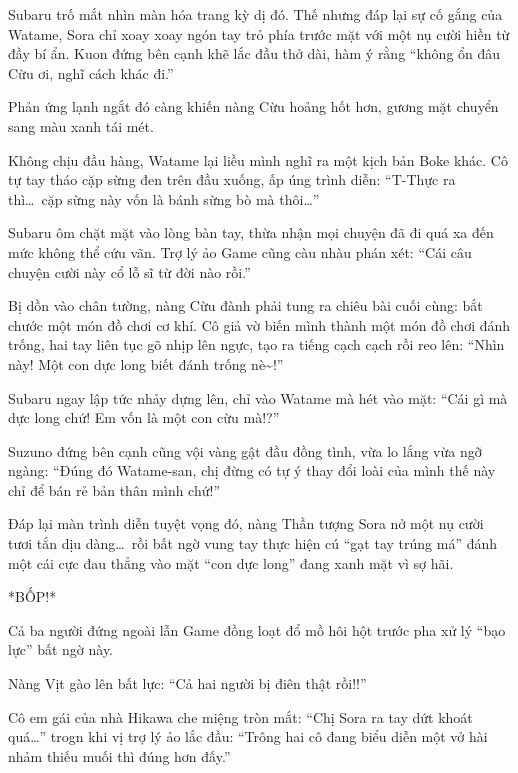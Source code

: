 \documentclass[../main.tex]{subfiles}
\begin{document}

Subaru trố mắt nhìn màn hóa trang kỳ dị đó. Thế nhưng đáp lại sự cố gắng của Watame, Sora chỉ xoay xoay ngón tay trỏ phía trước mặt với một nụ cười hiền từ đầy bí ẩn. Kuon đứng bên cạnh khẽ lắc đầu thở dài, hàm ý rằng ``không ổn đâu Cừu ơi, nghĩ cách khác đi.''

Phản ứng lạnh ngắt đó càng khiến nàng Cừu hoảng hốt hơn, gương mặt chuyển sang màu xanh tái mét.

Không chịu đầu hàng, Watame lại liều mình nghĩ ra một kịch bản Boke khác. Cô tự tay tháo cặp sừng đen trên đầu xuống, ấp úng trình diễn: ``T-Thực ra thì\dots\ cặp sừng này vốn là bánh sừng bò mà thôi\dots''


Subaru ôm chặt mặt vào lòng bàn tay, thừa nhận mọi chuyện đã đi quá xa đến mức không thể cứu vãn. Trợ lý ảo Game cũng càu nhàu phán xét: ``Cái câu chuyện cười này cổ lỗ sĩ từ đời nào rồi.''

Bị dồn vào chân tường, nàng Cừu đành phải tung ra chiêu bài cuối cùng: bắt chước một món đồ chơi cơ khí. Cô giả vờ biến mình thành một món đồ chơi đánh trống, hai tay liên tục gõ nhịp lên ngực, tạo ra tiếng cạch cạch rồi reo lên: ``Nhìn này! Một con dực long biết đánh trống nè\~{}!''


Subaru ngay lập tức nhảy dựng lên, chỉ vào Watame mà hét vào mặt: ``Cái gì mà dực long chứ! Em vốn là một con cừu mà!?''

Suzuno đứng bên cạnh cũng vội vàng gật đầu đồng tình, vừa lo lắng vừa ngỡ ngàng: ``Đúng đó Watame-san, chị đừng có tự ý thay đổi loài của mình thế này chỉ để bán rẻ bản thân mình chứ!''

Đáp lại màn trình diễn tuyệt vọng đó, nàng Thần tượng Sora nở một nụ cười tươi tắn dịu dàng\dots\ rồi bất ngờ vung tay thực hiện cú ``gạt tay trúng má'' đánh một cái cực đau thẳng vào mặt ``con dực long'' đang xanh mặt vì sợ hãi.

*BỐP!*


Cả ba người đứng ngoài lẫn Game đồng loạt đổ mồ hôi hột trước pha xử lý ``bạo lực'' bất ngờ này.

Nàng Vịt gào lên bất lực: ``Cả hai người bị điên thật rồi!!''

Cô em gái của nhà Hikawa che miệng tròn mắt: ``Chị Sora ra tay dứt khoát quá\dots'' trogn khi vị trợ lý ảo lắc đầu: ``Trông hai cô đang biểu diễn một vở hài nhảm thiếu muối thì đúng hơn đấy.''
\end{document}
